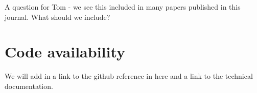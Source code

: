 \documentclass[unnumsec,webpdf,contemporary,large]{oup-authoring-template}%
\theoremstyle{thmstyleone}%
\theoremstyle{thmstyletwo}%
\theoremstyle{thmstylethree}%
\begin{document}
A question for Tom - we see this included in many papers published in this journal. What should we include?








\section{Code availability}

We will add in a link to the github reference in here and a link to the technical documentation. 






\end{document}
